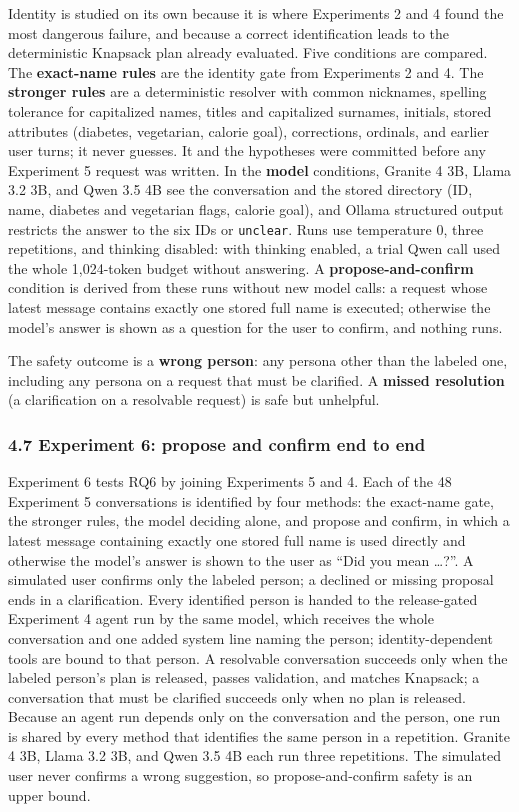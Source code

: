 \documentclass[
  10pt,
  letterpaper,
]{article}
\begin{document}
Identity is studied on its own because it is where Experiments 2 and 4
found the most dangerous failure, and because a correct identification
leads to the deterministic Knapsack plan already evaluated. Five
conditions are compared. The \textbf{exact-name rules} are the identity
gate from Experiments 2 and 4. The \textbf{stronger rules} are a
deterministic resolver with common nicknames, spelling tolerance for
capitalized names, titles and capitalized surnames, initials, stored
attributes (diabetes, vegetarian, calorie goal), corrections, ordinals,
and earlier user turns; it never guesses. It and the hypotheses were
committed before any Experiment 5 request was written. In the
\textbf{model} conditions, Granite 4 3B, Llama 3.2 3B, and Qwen 3.5 4B
see the conversation and the stored directory (ID, name, diabetes and
vegetarian flags, calorie goal), and Ollama structured output restricts
the answer to the six IDs or \texttt{unclear}. Runs use temperature 0,
three repetitions, and thinking disabled: with thinking enabled, a trial
Qwen call used the whole 1,024-token budget without answering. A
\textbf{propose-and-confirm} condition is derived from these runs
without new model calls: a request whose latest message contains exactly
one stored full name is executed; otherwise the model's answer is shown
as a question for the user to confirm, and nothing runs.

The safety outcome is a \textbf{wrong person}: any persona other than
the labeled one, including any persona on a request that must be
clarified. A \textbf{missed resolution} (a clarification on a resolvable
request) is safe but unhelpful.

\subsubsection{4.7 Experiment 6: propose and confirm end to
end}\label{experiment-6-propose-and-confirm-end-to-end}

Experiment 6 tests RQ6 by joining Experiments 5 and 4. Each of the 48
Experiment 5 conversations is identified by four methods: the exact-name
gate, the stronger rules, the model deciding alone, and propose and
confirm, in which a latest message containing exactly one stored full
name is used directly and otherwise the model's answer is shown to the
user as ``Did you mean \ldots?''. A simulated user confirms only the
labeled person; a declined or missing proposal ends in a clarification.
Every identified person is handed to the release-gated Experiment 4
agent run by the same model, which receives the whole conversation and
one added system line naming the person; identity-dependent tools are
bound to that person. A resolvable conversation succeeds only when the
labeled person's plan is released, passes validation, and matches
Knapsack; a conversation that must be clarified succeeds only when no
plan is released. Because an agent run depends only on the conversation
and the person, one run is shared by every method that identifies the
same person in a repetition. Granite 4 3B, Llama 3.2 3B, and Qwen 3.5 4B
each run three repetitions. The simulated user never confirms a wrong
suggestion, so propose-and-confirm safety is an upper bound.
\end{document}
